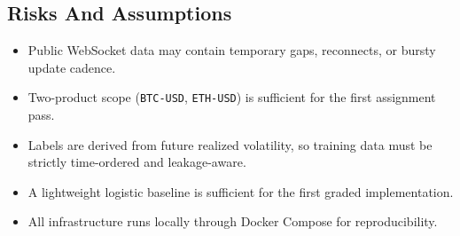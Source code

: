 \documentclass[
]{article}
\providecommand{\tightlist}{%
  \setlength{\itemsep}{0pt}\setlength{\parskip}{0pt}}
\begin{document}
\hypertarget{risks-and-assumptions}{%
\subsection{Risks And Assumptions}\label{risks-and-assumptions}}

\begin{itemize}
\tightlist
\item
  Public WebSocket data may contain temporary gaps, reconnects, or
  bursty update cadence.
\item
  Two-product scope (\texttt{BTC-USD}, \texttt{ETH-USD}) is sufficient
  for the first assignment pass.
\item
  Labels are derived from future realized volatility, so training data
  must be strictly time-ordered and leakage-aware.
\item
  A lightweight logistic baseline is sufficient for the first graded
  implementation.
\item
  All infrastructure runs locally through Docker Compose for
  reproducibility.
\end{itemize}
\end{document}
